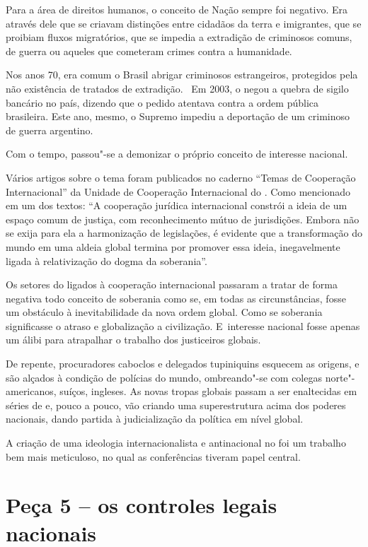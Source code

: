 Para a área de direitos humanos, o conceito de Nação sempre foi
negativo. Era através dele que se criavam distinções entre cidadãos da
terra e imigrantes, que se proibiam fluxos migratórios, que se impedia a
extradição de criminosos comuns, de guerra ou aqueles que cometeram
crimes contra a humanidade.

Nos anos 70, era comum o Brasil abrigar criminosos estrangeiros,
protegidos pela não existência de tratados de extradição.~ Em 2003, o
 negou a quebra de sigilo bancário no país, dizendo que o pedido
atentava contra a ordem pública brasileira. Este ano, mesmo, o Supremo
impediu a deportação de um criminoso de guerra argentino.

Com o tempo, passou"-se a demonizar o próprio conceito de interesse
nacional.

Vários artigos sobre o tema foram publicados no caderno ``Temas de
Cooperação Internacional'' da Unidade de Cooperação Internacional do
. Como mencionado em um dos textos: ``A cooperação jurídica
internacional constrói a ideia de um espaço comum de justiça, com
reconhecimento mútuo de jurisdições. Embora não se exija para ela a
harmonização de legislações, é evidente que a transformação do mundo em
uma aldeia global termina por promover essa ideia, inegavelmente ligada
à relativização do dogma da soberania''.

Os setores do  ligados à cooperação internacional passaram a tratar
de forma negativa todo conceito de soberania como se, em todas as
circunstâncias, fosse um obstáculo à inevitabilidade da nova ordem
global. Como se soberania significasse o atraso e globalização a
civilização. E~interesse nacional fosse apenas um álibi para atrapalhar
o trabalho dos justiceiros globais.

De repente, procuradores caboclos e delegados tupiniquins esquecem as
origens, e são alçados à condição de polícias do mundo, ombreando"-se com
colegas norte"-americanos, suíços, ingleses. As novas tropas globais
passam a ser enaltecidas em séries de  e, pouco a pouco, vão criando
uma superestrutura acima dos poderes nacionais, dando partida à
judicialização da política em nível global.

A criação de uma ideologia internacionalista e antinacional no  foi
um trabalho bem mais meticuloso, no qual as conferências tiveram papel
central.

\section{Peça 5 -- os controles legais nacionais}

